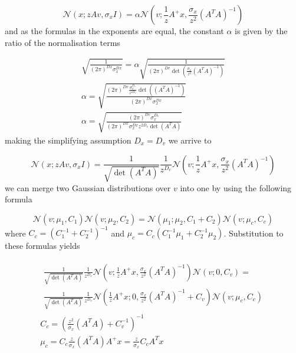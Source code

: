 \documentclass{paper}
\begin{document}
\begin{equation} 
\mathcal{N}(x;zAv,\sigma_x I) = \alpha \mathcal{N}(v;\frac{1}{z}A^{+}x,\frac{\sigma_x}{z^2} (A^TA)^{-1})
\end{equation}
%
and as the formulas in the exponents are equal, the constant  $\alpha$ is given by the ratio of the normalisation terms

\begin{eqnarray}
\sqrt{\frac{1}{(2\pi)^{Dx} \sigma_x^{Dx}}} = \alpha \sqrt{\frac{1}{(2\pi)^{Dv} \det(\frac{\sigma_x}{z^2} (A^TA)^{-1})}} \\
\alpha = \sqrt{\frac{ (2\pi)^{Dv} \frac{\sigma_x^{D_v}}{z^{2D_v}} \det( (A^TA)^{-1}) }{ (2\pi)^{Dx} \sigma_x^{Dx} }} \\
\alpha = \sqrt{\frac{ (2\pi)^{Dv} \sigma_x^{D_v} }{ (2\pi)^{Dx} \sigma_x^{Dx} z^{2D_v} \det(A^TA)}}
\end{eqnarray}
%
making the simplifying assumption $D_x = D_v$ we arrive to

\begin{equation} 
\mathcal{N}(x;zAv,\sigma_x I) = \frac{1}{\sqrt{\det(A^TA)}} \frac{1}{z^{D_v}} \mathcal{N}(v;\frac{1}{z}A^{+}x,\frac{\sigma_x}{z^2} (A^TA)^{-1})
\end{equation}
%
we can merge two Gaussian distributions over $v$ into one by using the following formula

\begin{equation} 
\mathcal{N}(v;\mu_1,C_1) \mathcal{N}(v;\mu_2,C_2) = \mathcal{N}(\mu_1;\mu_2,C_1 + C_2) \mathcal{N}(v; \mu_c,C_c)
\end{equation}
%
where $C_c = (C_1^{-1} + C_2^{-1})^{-1}$ and $\mu_c = C_c (C_1^{-1}\mu_1 + C_2^{-1}\mu_2)$. Substitution to these formulas yields

\begin{eqnarray}
\begin{split}
 \frac{1}{\sqrt{\det(A^TA)}} \frac{1}{z^{D_v}} \mathcal{N}(v;\frac{1}{z}A^{+}x,\frac{\sigma_x}{z^2} (A^TA)^{-1})\mathcal{N}(v;0,C_v) = \\
\frac{1}{\sqrt{\det(A^TA)}} \frac{1}{z^{D_v}} \mathcal{N}(\frac{1}{z}A^{+}x;0,\frac{\sigma_x}{z^2} (A^TA)^{-1} + C_v) \mathcal{N}(v; \mu_c,C_c)
 \end{split} \\
 C_c = (\frac{z^2}{\sigma_x} (A^TA) + C_v^{-1})^{-1} \\
 \mu_c = C_c \frac{z}{\sigma_x} (A^TA) A^{+}x = \frac{z}{\sigma_x} C_c A^{T}x
\end{eqnarray}
\end{document}
